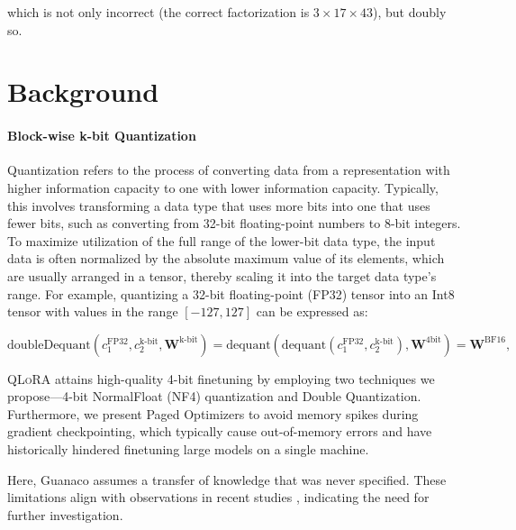 which is not only incorrect (the correct factorization is $3 \times 17 \times 43$), but doubly so.

\section{Background}
\paragraph{Block-wise k-bit Quantization} Quantization refers to the process of converting data from a representation with higher information capacity to one with lower information capacity. Typically, this involves transforming a data type that uses more bits into one that uses fewer bits, such as converting from 32-bit floating-point numbers to 8-bit integers. To maximize utilization of the full range of the lower-bit data type, the input data is often normalized by the absolute maximum value of its elements, which are usually arranged in a tensor, thereby scaling it into the target data type's range. For example, quantizing a 32-bit floating-point (FP32) tensor into an Int8 tensor with values in the range $[-127, 127]$ can be expressed as:

\begin{equation}
    \text{doubleDequant}(c_1^{\text{FP32}}, c_2^{\text{k-bit}}, \mathbf{W}^{\text{k-bit}}) = \text{dequant}(\text{dequant}(c_1^{\text{FP32}}, c_2^{\text{k-bit}}), \mathbf{W}^{\text{4bit}}) = \mathbf{W}^{\text{BF16}},
\end{equation}

\textsc{QLoRA} attains high-quality 4-bit finetuning by employing two techniques we propose—4-bit NormalFloat (NF4) quantization and Double Quantization. Furthermore, we present Paged Optimizers to avoid memory spikes during gradient checkpointing, which typically cause out-of-memory errors and have historically hindered finetuning large models on a single machine.

Here, {Guanaco} assumes a transfer of knowledge that was never specified. These limitations align with observations in recent studies \cite{sap2022neural}, indicating the need for further investigation.

